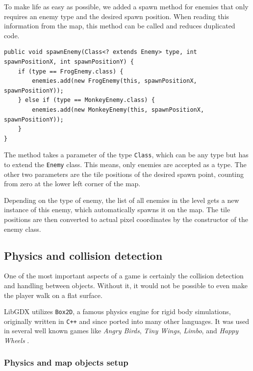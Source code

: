 \documentclass[12p]{article}
\begin{document}
To make life as easy as possible, we added a spawn method for enemies that only requires an enemy type and the desired spawn position. When reading this information from the map, this method can be called and reduces duplicated code.

\begin{verbatim}
public void spawnEnemy(Class<? extends Enemy> type, int spawnPositionX, int spawnPositionY) {
    if (type == FrogEnemy.class) {
        enemies.add(new FrogEnemy(this, spawnPositionX, spawnPositionY));
    } else if (type == MonkeyEnemy.class) {
        enemies.add(new MonkeyEnemy(this, spawnPositionX, spawnPositionY));
    }
}
\end{verbatim}

The method takes a parameter of the type \texttt{Class}, which can be any type but has to extend the \texttt{Enemy} class. This means, only enemies are accepted as a type. The other two parameters are the tile positions of the desired spawn point, counting from zero at the lower left corner of the map.

Depending on the type of enemy, the list of all enemies in the level gets a new instance of this enemy, which automatically spawns it on the map. The tile positions are then converted to actual pixel coordinates by the constructor of the enemy class.

 
\newpage
\subsection{Physics and collision detection} \label{DocCollisions}

One of the most important aspects of a game is certainly the collision detection and handling between objects. Without it, it would not be possible to even make the player walk on a flat surface.

LibGDX utilizes \texttt{Box2D}, a famous physics engine for rigid body simulations, originally written in \texttt{C++} and since ported into many other languages. It was used in several well known games like \emph{Angry Birds}, \emph{Tiny Wings}, \emph{Limbo}, and \emph{Happy Wheels} \cite{box2DGithub}\cite{box2DWikipedia}.

\subsubsection{Physics and map objects setup} \label{DocPhysicsAndBodySetup}
\end{document}
